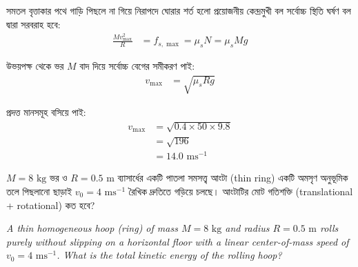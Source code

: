 \documentclass[12pt, a4paper]{article}
\begin{document}
\begin{tcolorbox}[solutionbox={সমাধান (Solution)}]
    \noindent
    সমতল বৃত্তাকার পথে গাড়ি পিছলে না গিয়ে নিরাপদে ঘোরার শর্ত হলো প্রয়োজনীয় কেন্দ্রমুখী বল সর্বোচ্চ স্থিতি ঘর্ষণ বল দ্বারা সরবরাহ হবে:
    \begin{align*}
        \frac{M v_{\max}^2}{R} &= f_{s,\max} = \mu_s N = \mu_s M g
    \end{align*}
    
    উভয়পক্ষ থেকে ভর $M$ বাদ দিয়ে সর্বোচ্চ বেগের সমীকরণ পাই:
    \begin{align*}
        v_{\max} &= \sqrt{\mu_s R g}
    \end{align*}
    
    প্রদত্ত মানসমূহ বসিয়ে পাই:
    \begin{align*}
        v_{\max} &= \sqrt{0.4 \times 50 \times 9.8} \\
                  &= \sqrt{196} \\
                  &= \mathbf{14.0}\text{ ms}^{-1}
    \end{align*}
\end{tcolorbox}
\begin{tcolorbox}[questionbox={প্রশ্ন (Question) 17}]
    \noindent
    $M = 8\text{ kg}$ ভর ও $R = 0.5\text{ m}$ ব্যাসার্ধের একটি পাতলা সমসত্ত্ব আংটা (thin ring) একটি অমসৃণ অনুভূমিক তলে পিছলানো ছাড়াই $v_0 = 4\text{ ms}^{-1}$ রৈখিক দ্রুতিতে গড়িয়ে চলছে। আংটাটির মোট গতিশক্তি (translational + rotational) কত হবে?
    
    \vspace{0.8em}
    \begin{english}
    \noindent\textit{\color{darkgray}
    A thin homogeneous hoop (ring) of mass $M = 8\text{ kg}$ and radius $R = 0.5\text{ m}$ rolls purely without slipping on a horizontal floor with a linear center-of-mass speed of $v_0 = 4\text{ ms}^{-1}$. What is the total kinetic energy of the rolling hoop?
    }
    \end{english}
\end{tcolorbox}
\end{document}
